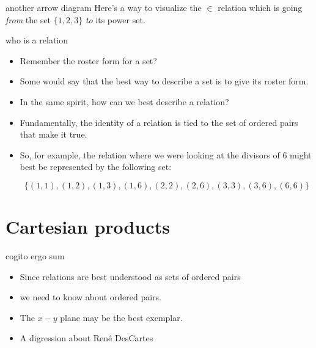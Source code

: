 \documentclass[handout,landscape]{beamer}
\begin{document}
\begin{frame}{another arrow diagram}
Here's a way to visualize the $\in$ relation which is going {\em from} the set $\{1,2,3\}$ {\em to} its power set. \pause

\begin{center}

\end{center}   
\end{frame}


\begin{frame}{who is a relation}
\begin{itemize}
\item Remember the roster form for a set? \pause
\item Some would say that the best way to describe a set is to give its roster form. \pause
\item In the same spirit, how can we best describe a relation? \pause
\item Fundamentally, the identity of a relation is tied to the set of ordered pairs that make it true.\pause
\item So, for example, the relation where we were looking at the divisors of 6 might best be represented by the following set: \pause

\[ \{ (1,1), (1,2), (1,3), (1,6), (2,2), (2,6), (3,3), (3,6), (6,6) \} \]

\end{itemize}
\end{frame}

\section{Cartesian products}

\begin{frame}{cogito ergo sum}
\begin{itemize}
\item Since relations are best understood as sets of ordered pairs \pause
\item we need to know about ordered pairs. \pause
\item The $x-y$ plane may be the best exemplar. \pause
\item A digression about Ren\'{e} DesCartes\textellipsis
\end{itemize}
\end{frame}
\end{document}
